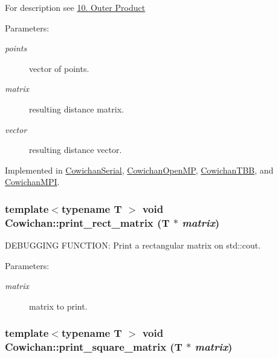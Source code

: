 For description see \hyperlink{index_outer_sec}{10. Outer Product} \begin{Desc}
\item[Parameters:]
\begin{description}
\item[{\em points}]vector of points. \item[{\em matrix}]resulting distance matrix. \item[{\em vector}]resulting distance vector. \end{description}
\end{Desc}


Implemented in \hyperlink{class_cowichan_serial_05f6899081a457d58978e4f6bda2db6a}{CowichanSerial}, \hyperlink{class_cowichan_open_m_p_99a0570f754ac82968d73093476de533}{CowichanOpenMP}, \hyperlink{class_cowichan_t_b_b_92a763b9733cdcceda13b7b7ea0bc229}{CowichanTBB}, and \hyperlink{class_cowichan_m_p_i_39fcc8a331b0e26438fbf43fa01cf7c1}{CowichanMPI}.\hypertarget{class_cowichan_14e706ef5a5f7661a623c595d7ed76f1}{
\subsubsection[{print\_\-rect\_\-matrix}]{\setlength{\rightskip}{0pt plus 5cm}template$<$typename T $>$ void Cowichan::print\_\-rect\_\-matrix (T $\ast$ {\em matrix})}}
\label{class_cowichan_14e706ef5a5f7661a623c595d7ed76f1}


DEBUGGING FUNCTION: Print a rectangular matrix on std::cout. \begin{Desc}
\item[Parameters:]
\begin{description}
\item[{\em matrix}]matrix to print. \end{description}
\end{Desc}
\hypertarget{class_cowichan_e8fdfb7dd3e8be0a7e9dbc531b1298d2}{
\subsubsection[{print\_\-square\_\-matrix}]{\setlength{\rightskip}{0pt plus 5cm}template$<$typename T $>$ void Cowichan::print\_\-square\_\-matrix (T $\ast$ {\em matrix})}}
\label{class_cowichan_e8fdfb7dd3e8be0a7e9dbc531b1298d2}


